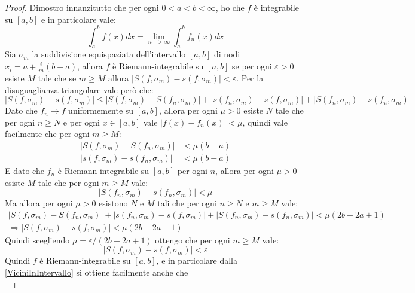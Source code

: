 \begin{proof}
	Dimostro innanzitutto che per ogni $0<a<b<\infty$, ho che $f$ è integrabile su $[a,b]$ e in particolare vale:
	\begin{equation*}
		\int_a^b{f(x)dx}=\lim_{n->\infty}\int_a^b{f_n(x)dx}
	\end{equation*}
	Sia $\sigma_m$ la suddivisione equispaziata dell'intervallo $[a,b]$ di nodi $x_i=a+\frac{i}{m}(b-a)$,
	allora $f$ è Riemann-integrabile su $[a,b]$ se per ogni $\varepsilon>0$ esiste $M$ tale che se $m\ge M$
	allora $|S(f,\sigma_m)-s(f,\sigma_m)|<\varepsilon$.
	Per la disuguaglianza triangolare vale però che:
	\begin{equation*}
		|S(f,\sigma_m)-s(f,\sigma_m)|\le  
		|S(f,\sigma_m)-S(f_n,\sigma_m)|+ |s(f_n,\sigma_m)-s(f,\sigma_m)|+ |S(f_n,\sigma_m)-s(f_n,\sigma_m)|
	\end{equation*}
	Dato che $f_n\to f$ uniformemente su $[a,b]$, allora per ogni $\mu>0$ esiste $N$ tale che per ogni
	$n\ge N$ e per ogni $x\in[a,b]$ vale $|f(x)-f_n(x)|<\mu$, quindi vale facilmente che per ogni $m\ge M$:
	\begin{equation} \label{ViciniInIntervallo}
	\begin{split}
		|S(f,\sigma_m)-S(f_n,\sigma_m)| & <\mu(b-a) \\
		|s(f,\sigma_m)-s(f_n,\sigma_m)| & <\mu(b-a)
	\end{split}
	\end{equation} 
	E dato che $f_n$ è Riemann-integrabile
	su $[a,b]$ per ogni $n$, allora per ogni $\mu>0$ esiste $M$ tale che per ogni $m\ge M$ vale:
	\begin{equation}
		|S(f_n,\sigma_m)-s(f_n,\sigma_m)|<\mu
	\end{equation}
	Ma allora per ogni $\mu>0$ esistono $N$ e $M$ tali che per ogni $n\ge N$ e $m\ge M$ vale:
	\begin{gather*}
		|S(f,\sigma_m)-S(f_n,\sigma_m)|+ |s(f_n,\sigma_m)-s(f,\sigma_m)|+ |S(f_n,\sigma_m)-s(f_n,\sigma_m)|<\mu(2b-2a+1) \\
		\Longrightarrow |S(f,\sigma_m)-s(f,\sigma_m)|< \mu(2b-2a+1)
	\end{gather*}
	Quindi scegliendo $\mu=\varepsilon/(2b-2a+1)$ ottengo che per ogni $m\ge M$ vale:
	\begin{equation*}
	|S(f,\sigma_m)-s(f,\sigma_m)|< \varepsilon
	\end{equation*}
	Quindi $f$ è Riemann-integrabile su $[a,b]$, e in particolare dalla \cref{ViciniInIntervallo} si ottiene facilmente
	anche che
	\begin{equation}\label{IntegraleInIntervallo}

\end{equation}
\end{proof}
